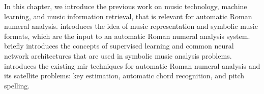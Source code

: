 

In this chapter, we introduce the previous work on music
technology, machine learning, and music information
retrieval, that is relevant for automatic Roman numeral
analysis.  introduces the idea
of music representation and symbolic music formats, which
are the input to an automatic Roman numeral analysis system.
 briefly introduces the concepts
of supervised learning and common neural network
architectures that are used in symbolic music analysis
problems.  introduces the
existing \gls{mir} techniques for automatic Roman numeral analysis
and its satellite problems: key estimation, automatic chord
recognition, and pitch spelling.
